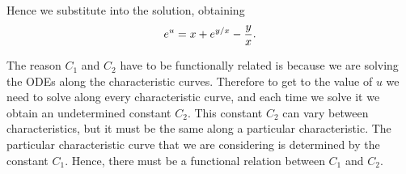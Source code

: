 Hence we substitute  into the solution, obtaining
\begin{equation}
  e^u = x + e^{y/x} - {y \over x}.
\end{equation}

The reason $C_1$ and $C_2$ have to be functionally related is because we are
solving the ODEs along the characteristic curves. Therefore to get to the value
of $u$ we need to solve along every characteristic curve, and each time we solve
it we obtain an undetermined constant $C_2$. This constant $C_2$ can vary
between characteristics, but it must be the same along a particular
characteristic. The particular characteristic curve that we are considering is
determined by the constant $C_1$. Hence, there must be a functional relation
between $C_1$ and $C_2$.
